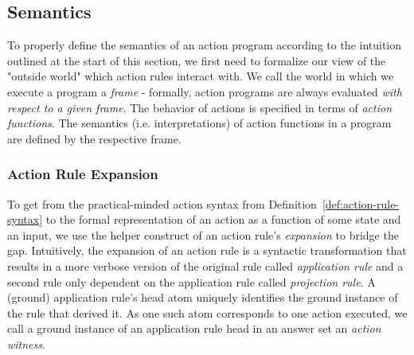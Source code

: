 \subsection{Semantics}
\label{subsec:evolog-actions-semantics}

To properly define the semantics of an action program according to the intuition outlined at the start of this section, we first need to formalize our view of the "outside world" which action rules interact with. We call the world in which we execute a program a \emph{frame} - formally, action programs are always evaluated \emph{with respect to a given frame}. The behavior of actions is specified in terms of \emph{action functions}. The semantics (i.e. interpretations) of action functions in a program are defined by the respective frame.

\subsubsection{Action Rule Expansion}
\label{subsubsec:evolog-actions-semantics-expansion}

To get from the practical-minded action syntax from Definition~\ref{def:action-rule-syntax} to the formal representation of an action as a function of some state and an input, we use the helper construct of an action rule's \emph{expansion} to bridge the gap. Intuitively, the expansion of an action rule is a syntactic transformation that results in a more verbose version of the original rule called \emph{application rule} and a second rule only dependent on the application rule called \emph{projection rule}. A (ground) application rule's head atom uniquely identifies the ground instance of the rule that derived it. As one such atom corresponds to one action executed, we call a ground instance of an application rule head in an answer set an \emph{action witness}. 


